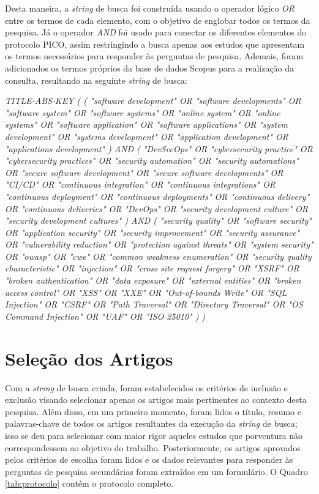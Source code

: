 Desta maneira, a \textit{string} de busca foi construída usando o operador lógico \textit{OR} entre os termos de cada elemento, com o objetivo de englobar todos os termos da pesquisa. Já o operador \textit{AND} foi usado para conectar os diferentes elementos do protocolo PICO, assim restringindo a busca apenas aos estudos que apresentam os termos necessários para responder às perguntas de pesquisa. Ademais, foram adicionados os termos próprios da base de dados Scopus para a realização da consulta, resultando na seguinte \textit{string} de busca:

\begin{center}
    \textit{TITLE-ABS-KEY ( ( "software development" OR "software developments" OR "software system" OR "software systems" OR "online system" OR "online systems" OR "software application" OR "software applications" OR "system development" OR "systems development" OR "application development" OR "applications development" ) AND ( "DevSecOps" OR "cybersecurity practice" OR "cybersecurity practices" OR "security automation" OR "security automations" OR "secure software development" OR "secure software developments" OR "CI/CD" OR "continuous integration" OR "continuous integrations" OR "continuous deployment" OR "continuous deployments" OR "continuous delivery" OR "continuous deliveries" OR "DevOps" OR "security development culture" OR "security development cultures" ) AND ( "security quality" OR "software security" OR "application security" OR "security improvement" OR "security assurance" OR "vulnerability reduction" OR "protection against threats" OR "system security" OR "owasp" OR "cwe" OR "common weakness enumeration" OR "security quality characteristic" OR "injection" OR "cross site request forgery" OR "XSRF" OR "broken authentication" OR "data exposure" OR "external entities" OR "broken access control" OR "XSS" OR "XXE" OR "Out-of-bounds Write" OR "SQL Injection" OR "CSRF" OR "Path Traversal" OR "Directory Traversal" OR "OS Command Injection" OR "UAF" OR "ISO 25010" ) ) }
\end{center}

\section{Seleção dos Artigos}
\label{sec:selecao-artigos}

Com a \textit{string} de busca criada, foram estabelecidos os critérios de inclusão e exclusão visando selecionar apenas os artigos mais pertinentes ao contexto desta pesquisa. Além disso, em um primeiro momento, foram lidos o título, resumo e palavras-chave de todos os artigos resultantes da execução da \textit{string} de busca; isso se deu para selecionar com maior rigor aqueles estudos que porventura não correspondessem ao objetivo do trabalho. Posteriormente, os artigos aprovados pelos critérios de escolha foram lidos e os dados relevantes para responder às perguntas de pesquisa secundárias foram extraídos em um formulário. O Quadro \ref{tab:protocolo} contém o protocolo completo.

